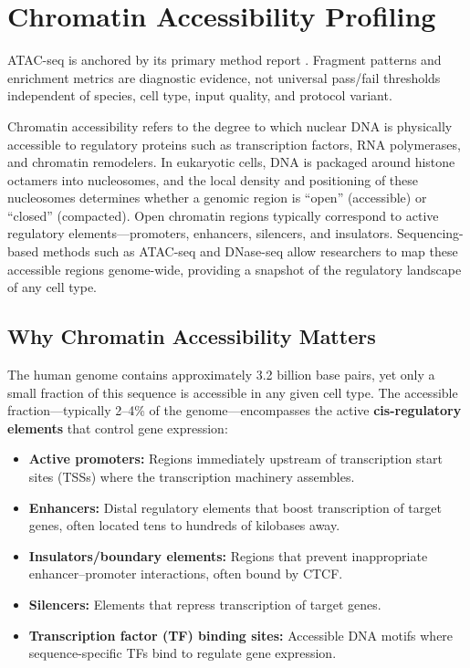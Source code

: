 \chapter{Chromatin Accessibility Profiling}
\label{ch:chromatin}

\begin{sourcebox}
ATAC-seq is anchored by its primary method report \cite{buenrostro2013}. Fragment patterns and enrichment metrics are diagnostic evidence, not universal pass/fail thresholds independent of species, cell type, input quality, and protocol variant.
\end{sourcebox}

\begin{keyconcept}
Chromatin accessibility refers to the degree to which nuclear DNA is physically accessible to regulatory proteins such as transcription factors, RNA polymerases, and chromatin remodelers. In eukaryotic cells, DNA is packaged around histone octamers into nucleosomes, and the local density and positioning of these nucleosomes determines whether a genomic region is ``open'' (accessible) or ``closed'' (compacted). Open chromatin regions typically correspond to active regulatory elements---promoters, enhancers, silencers, and insulators. Sequencing-based methods such as ATAC-seq and DNase-seq allow researchers to map these accessible regions genome-wide, providing a snapshot of the regulatory landscape of any cell type.
\end{keyconcept}

\section{Why Chromatin Accessibility Matters}
\label{sec:chromatin:why}

The human genome contains approximately 3.2 billion base pairs, yet only a small fraction of this sequence is accessible in any given cell type. The accessible fraction---typically 2--4\% of the genome---encompasses the active \textbf{cis-regulatory elements} that control gene expression:

\begin{itemize}[itemsep=3pt]
  \item \textbf{Active promoters:} Regions immediately upstream of transcription start sites (TSSs) where the transcription machinery assembles.
  \item \textbf{Enhancers:} Distal regulatory elements that boost transcription of target genes, often located tens to hundreds of kilobases away.
  \item \textbf{Insulators/boundary elements:} Regions that prevent inappropriate enhancer--promoter interactions, often bound by CTCF.
  \item \textbf{Silencers:} Elements that repress transcription of target genes.
  \item \textbf{Transcription factor (TF) binding sites:} Accessible DNA motifs where sequence-specific TFs bind to regulate gene expression.
\end{itemize}

